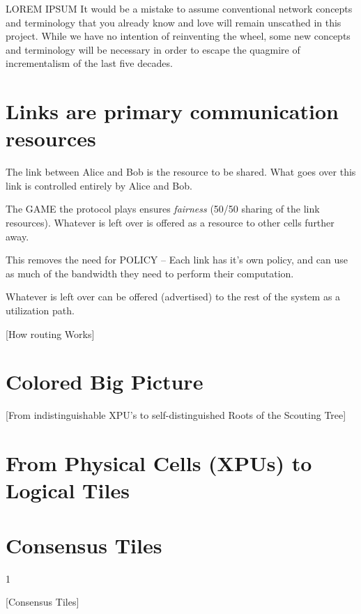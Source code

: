\documentclass[../../../OAE-SPEC-MAIN.tex]{subfiles}
\begin{document}
LOREM IPSUM It would be a mistake to assume conventional network concepts and terminology that you already know and love will remain unscathed in this project. While we have no intention of reinventing the wheel,  some new concepts and terminology will be necessary in order to escape the quagmire of incrementalism of the last five decades.  




\section{Links are primary communication resources}

The link between Alice and Bob is the resource to be shared.  What goes over this link is controlled entirely by Alice and Bob.

The GAME the protocol plays ensures \emph{fairness} (50/50 sharing of the link resources). Whatever is left over is offered as a resource to other cells further away.

This removes the need for POLICY -- Each link has it's own policy, and can use as much of the bandwidth they need to perform their computation.

Whatever is left over can be offered (advertised) to the rest of the system as a utilization path.

\clearpage

[How routing Works]

\clearpage

\section{Colored Big Picture}
[From indistinguishable XPU's to self-distinguished Roots of the Scouting Tree]

\clearpage


\section{From Physical Cells (XPUs) to Logical Tiles}

\section{Consensus Tiles} 1

[Consensus Tiles]
\end{document}
